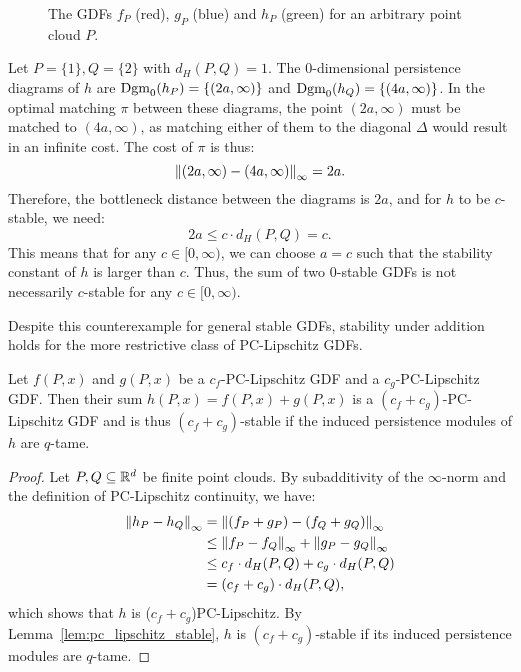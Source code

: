 \begin{example}
\begin{figure}
        \caption{The GDFs $f_P$ (red), $g_P$ (blue) and $h_P$ (green) for
            an arbitrary point cloud $P$.}
        \label{fig:sum_stable_gdfs}
    \end{figure}
    
    Let $P = \{1\}, Q = \{2\}$ with $d_H(P, Q) = 1$.
    The 0-dimensional persistence diagrams of $h$ are
    $\operatorname{Dgm}_0(h_P) = \{(2a, \infty)\}$ and $\operatorname{Dgm}_0(h_Q) = \{(4a, \infty)\}$.
    In the optimal matching $\pi$ between these diagrams, the point $(2a, \infty)$
    must be matched to $(4a, \infty)$, as matching either of them to the
    diagonal $\Delta$ would result in an infinite cost.
    The cost of $\pi$ is thus:
    \begin{equation}
        \norm{(2a, \infty) - (4a, \infty)}_\infty = 2a.
    \end{equation}
    Therefore, the bottleneck distance between the diagrams is $2a$,
    and for $h$ to be $c$-stable, we need:
    \begin{equation}
        2a \leq c \cdot d_H(P, Q) = c.
    \end{equation}
    This means that for any $c \in [0, \infty)$, we can choose $a = c$ such that
    the stability constant of $h$ is larger than $c$.
    Thus, the sum of two $0$-stable GDFs is not necessarily $c$-stable for
    any $c \in [0, \infty)$.
\end{example}

Despite this counterexample for general stable GDFs, stability under addition
holds for the more restrictive class of PC-Lipschitz GDFs.
\begin{theorem}
    \label{thm:sum_pc_lipschitz}
    Let $f(P, x)$ and $g(P, x)$ be a $c_f$-PC-Lipschitz GDF and a
    $c_g$-PC-Lipschitz GDF. Then their sum $h(P, x) = f(P, x) + g(P, x)$ is
    a $(c_f + c_g)$-PC-Lipschitz GDF and is thus $(c_f + c_g)$-stable
    if the induced persistence modules of $h$ are $q$-tame.
\end{theorem}
\begin{proof}
    Let $P, Q \subseteq \mathbb{R}^d$ be finite point clouds.
    By subadditivity of the $\infty$-norm and the definition of
    PC-Lipschitz continuity, we have:
    \begin{align}
        \norm{h_P - h_Q}_\infty &= \norm{(f_P + g_P) - (f_Q + g_Q)}_\infty \\
        & \leq \norm{f_P - f_Q}_\infty + \norm{g_P - g_Q}_\infty \\
        & \leq c_f \cdot d_H(P, Q) + c_g \cdot d_H(P, Q) \\
        & = (c_f + c_g) \cdot d_H(P, Q),
    \end{align}
    which shows that $h$ is ($c_f + c_g$)PC-Lipschitz.
    By Lemma~\ref{lem:pc_lipschitz_stable}, $h$ is $(c_f + c_g)$-stable if its
    induced persistence modules are $q$-tame.
\end{proof}


